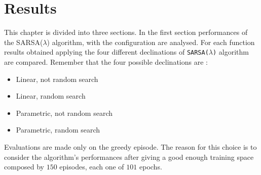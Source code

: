 \chapter{Results}

This chapter is divided into three sections. In the first section performances of the SARSA($\lambda$) algorithm, with the configuration are analysed. For each function results obtained applying the four different declinations of {\tt SARSA($\lambda$)} algorithm are compared. Remember that the four possible declinations are :

\begin{itemize}
	\item Linear, not random search
	\item Linear, random search
	\item Parametric, not random search
	\item Parametric, random search
\end{itemize}

Evaluations are made only on the greedy episode. The reason for this choice is to consider the algorithm's performances after giving a good enough training space composed by $150$ episodes, each one of $101$ epochs. \\

